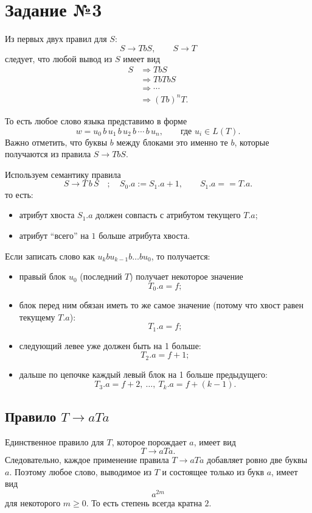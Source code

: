 \documentclass[12pt,a4paper]{article}
\begin{document}
\newpage

\section*{Задание №3}
Из первых двух правил для $S$:
\[
S \to TbS,\qquad S \to T
\]
следует, что любой вывод из $S$ имеет вид
\begin{align*}
S &\Rightarrow TbS\\
  &\Rightarrow TbTbS\\
  &\Rightarrow \cdots\\
  &\Rightarrow (Tb)^nT.
\end{align*}

То есть любое слово языка представимо в форме
\[
w = u_0\,b\,u_1\,b\,u_2\,b\,\cdots\,b\,u_n,
\qquad \text{где } u_i \in L(T).
\]
Важно отметить, что буквы $b$ между блоками это именно те $b$, которые получаются из правила $S \to TbS$.

Используем семантику правила
\[
S \to T\,b\,S
\quad;\quad
S_0.a := S_1.a + 1,\qquad S_1.a == T.a.
\]
то есть:
\begin{itemize}
  \item атрибут хвоста $S_1.a$ должен совпасть с атрибутом текущего $T.a$;
  \item атрибут ``всего'' на $1$ больше атрибута хвоста.
\end{itemize}

Если записать слово как $u_kbu_{k-1}b\ldots bu_0$, то получается:
\begin{itemize}
  \item правый блок $u_0$ (последний $T$) получает некоторое значение
  \[
  T_0.a = f;
  \]
  \item блок перед ним обязан иметь то же самое значение (потому что хвост равен текущему $T.a$):
  \[
  T_1.a = f;
  \]
  \item следующий левее уже должен быть на 1 больше:
  \[
  T_2.a = f + 1;
  \]
  \item дальше по цепочке каждый левый блок на 1 больше предыдущего:
  \[
  T_3.a = f + 2,\ \ldots,\ T_k.a = f + (k - 1).
  \]
\end{itemize}

\subsection*{Правило $T\to aTa$}
Единственное правило для $T$, которое порождает $a$, имеет вид
\[
T \to aTa.
\]
Следовательно, каждое применение правила $T\to aTa$ добавляет ровно две буквы $a$. Поэтому любое слово, выводимое из $T$ и состоящее только из букв $a$, имеет вид
\[
a^{2m}
\]
для некоторого $m\ge 0$. То есть степень всегда кратна $2$.
\end{document}
